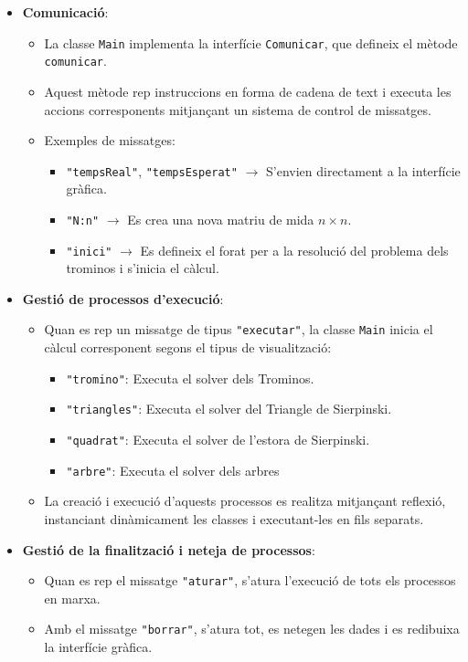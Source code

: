\documentclass{ieeetj}
\begin{document}
\begin{itemize}
\begin{itemize}
    \item \textbf{Comunicació}:
    \begin{itemize}
        \item La classe \texttt{Main} implementa la interfície \texttt{Comunicar}, que defineix el mètode \texttt{comunicar}.
        \item Aquest mètode rep instruccions en forma de cadena de text i executa les accions corresponents mitjançant un sistema de control de missatges.
        \item Exemples de missatges:
            \begin{itemize}
                \item \texttt{"tempsReal"}, \texttt{"tempsEsperat"} $\rightarrow$ S'envien directament a la interfície gràfica.
                \item \texttt{"N:n"} $\rightarrow$ Es crea una nova matriu de mida \(n \times n\).
                \item \texttt{"inici"} $\rightarrow$ Es defineix el forat per a la resolució del problema dels trominos i s'inicia el càlcul.
            \end{itemize}
    \end{itemize}
    
    \item \textbf{Gestió de processos d'execució}:
    \begin{itemize}
        \item Quan es rep un missatge de tipus \texttt{"executar"}, la classe \texttt{Main} inicia el càlcul corresponent segons el tipus de visualització:
        \begin{itemize}
            \item \texttt{"tromino"}: Executa el solver dels Trominos.
            \item \texttt{"triangles"}: Executa el solver del Triangle de Sierpinski.
            \item \texttt{"quadrat"}: Executa el solver de l'estora de Sierpinski.
            \item \texttt{"arbre"}:  Executa el solver dels arbres
        \end{itemize}
        \item La creació i execució d'aquests processos es realitza mitjançant reflexió, instanciant dinàmicament les classes i executant-les en fils separats.
    \end{itemize}
    
    \item \textbf{Gestió de la finalització i neteja de processos}:
    \begin{itemize}
        \item Quan es rep el missatge \texttt{"aturar"}, s'atura l'execució de tots els processos en marxa.
        \item Amb el missatge \texttt{"borrar"}, s'atura tot, es netegen les dades i es redibuixa la interfície gràfica.
    \end{itemize}


\end{itemize}
\end{itemize}
\end{document}
